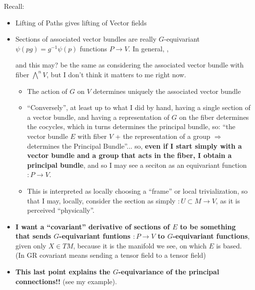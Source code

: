 {
\color{gray}
Recall:
    \begin{itemize}
    
    \item Lifting of Paths gives lifting of Vector fields
    
    \item Sections of associated vector bundles are really $G$-equivariant $\psi(pg) = g^{-1} \psi(p)$ functions $P \to V$. In general, , 
    
    and this may? be the same as considering the associated vector bundle with fiber $\bigwedge^n V$, but I don't think it matters to me right now.
    
        \begin{itemize}
        
        \item The action of $G$ on $V$ determines uniquely the associated vector bundle
        
        \item ``Conversely'', at least up to what I did by hand, having a single section of a vector bundle, and having a representation of $G$ on the fiber determines the cocycles, which in turns determines the principal bundle, so: ``the vector bundle $E$ with fiber $V$ + the representation of a group $\Longrightarrow$ determines the Principal Bundle''... so, \textbf{even if I start simply with a vector bundle and a group that acts in the fiber, I obtain a principal bundle}, and so I may see a seciton as an equivariant function $:P \to V$.
        
        \item This is interpreted as locally choosing a ``frame'' or local trivialization, so that I may, locally, consider the section as simply $:U \subset M \to V$, as it is perceived ``physically''.
            
        \end{itemize}
    
    \item \textbf{I want a ``covariant'' derivative of sections of $E$ to be something that sends $G$-equivariant funtions $:P \to V$ to $G$-equivariant functions},  given only $X \in TM$, because it is the manifold we see, on which $E$ is based. (In GR covariant means sending a tensor field to a tensor field)
    
    \item \textbf{This last point explains the $G$-equivariance of the principal connections!!} (see my example).
    

\end{itemize}}
